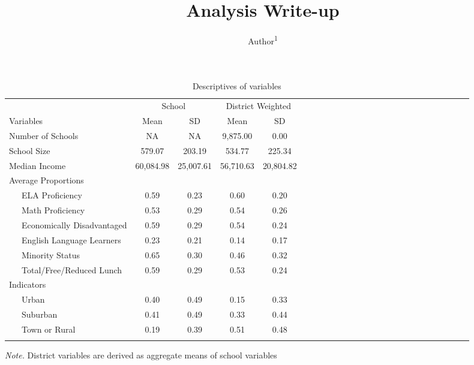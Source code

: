 \documentclass[man]{apa6}
\title{Analysis Write-up}
\author{Author\textsuperscript{1}}
\affiliation{
    \vspace{0.5cm}
          \textsuperscript{1} School/Bakery  }
\theoremstyle{definition}
\theoremstyle{definition}
\theoremstyle{definition}
\theoremstyle{remark}
\begin{document}
\maketitle

\setcounter{secnumdepth}{0}



\begin{table}[tbp]
\begin{center}
\begin{threeparttable}
\caption{\label{tab:tbl-desc}Descriptives of variables}
\begin{tabular}{lcccclcccclcccclcccclcccc}
\toprule
 & \multicolumn{2}{c}{School} & \multicolumn{2}{c}{District Weighted} \\
\cmidrule(r){2-3} \cmidrule(r){4-5}
Variables & Mean & SD & Mean & SD\\
\midrule
Number of Schools & NA & NA & 9,875.00 & 0.00\\
School Size & 579.07 & 203.19 & 534.77 & 225.34\\
Median Income & 60,084.98 & 25,007.61 & 56,710.63 & 20,804.82\\
Average Proportions &  &  &  & \\
\ \ \ ELA Proficiency & 0.59 & 0.23 & 0.60 & 0.20\\
\ \ \ Math Proficiency & 0.53 & 0.29 & 0.54 & 0.26\\
\ \ \ Economically Disadvantaged & 0.59 & 0.29 & 0.54 & 0.24\\
\ \ \ English Language Learners & 0.23 & 0.21 & 0.14 & 0.17\\
\ \ \ Minority Status & 0.65 & 0.30 & 0.46 & 0.32\\
\ \ \ Total/Free/Reduced Lunch & 0.59 & 0.29 & 0.53 & 0.24\\
Indicators &  &  &  & \\
\ \ \ Urban & 0.40 & 0.49 & 0.15 & 0.33\\
\ \ \ Suburban & 0.41 & 0.49 & 0.33 & 0.44\\
\ \ \ Town or Rural & 0.19 & 0.39 & 0.51 & 0.48\\
\bottomrule
\addlinespace
\end{tabular}
\begin{tablenotes}[para]
\textit{Note.} District variables are derived as aggregate means of school variables
\end{tablenotes}
\end{threeparttable}
\end{center}
\end{table}
\end{document}
